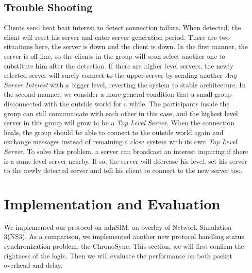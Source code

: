 \documentclass[conference]{IEEEtran}
\begin{document}
\subsection{Trouble Shooting}
\label{trouble_shooting}
Clients send heat beat interest to detect connection failure.
When detected, the client will reset his server and enter server generation period.
There are two situations here, the server is down and the client is down.
In the first manner, the server is off-line,
so the clients in the group will soon select another one to substitute him after the detection.
If there are higher level servers,
the newly selected server will surely connect to the upper server by sending another
\emph{Any Server Interest} with a bigger level, reverting the system to stable architecture.
In the second manner,
we consider a more general condition that a small group disconnected
with the outside world for a while.
The participants inside the group can still communicate with each other in this case,
and the highest level server in this group will grow to be a \emph{Top Level Server}.
When the connection heals,
the group should be able to connect to the outside world again and
exchange messages instead of remaining a close system with its own \emph{Top Level Server}.
To solve this problem, a server can broadcast an interest inquiring if there is a same level server nearby.
If so, the server will decrease his level,
set his server to the newly detected server and tell his client to connect to the new server too.

\section{Implementation and Evaluation}
\label{implementation}
We implemented our protocol on ndnSIM,
an overlay of Network Simulation 3(NS3)\cite{ns3}.
As a comparison, we implemented another new protocol handling status synchronization problem,
the ChronoSync. This section, we will first confirm the rightness of the logic.
Then we will evaluate the performance on both packet overhead and delay.
\end{document}
